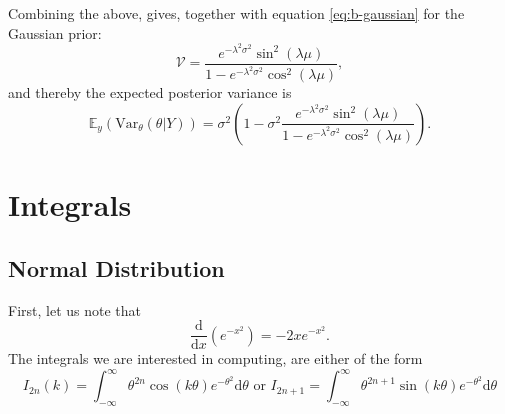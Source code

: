 \documentclass[]{report}
\begin{document}
Combining the above, gives, together with equation \eqref{eq:b-gaussian} for the Gaussian prior:
\begin{equation}
    \mathcal{V} = \frac{e^{-\lambda^2\sigma^2} \sin^2(\lambda\mu)}{1-e^{-\lambda^2\sigma^2} \cos^2(\lambda\mu)},
\end{equation}
and thereby the expected posterior variance is
\begin{equation}
    \mathbb{E}_y(\text{Var}_{\theta}(\theta | Y)) = \sigma^2(1-\sigma^2\frac{e^{-\lambda^2\sigma^2} \sin^2(\lambda\mu)}{1-e^{-\lambda^2\sigma^2} \cos^2(\lambda\mu)}).
\end{equation}

\appendix

\chapter{Integrals}
\section{Normal Distribution}
First, let us note that
\[
\frac{\text{d}}{\text{d}x}(e^{- x^2}) = - 2 x e^{ - x ^2}
.\]
The integrals we are interested in computing, are either of the form
\[
	I_{2n}(k) = \int_{- \infty}^{\infty} \theta^{2n} \cos (k \theta) e^{ - \theta^2}\text{d}\theta \text{ or } I_{2n + 1} = \int_{- \infty}^{\infty} \theta^{2n + 1} \sin (k \theta) e^{ - \theta^2}\text{d} \theta
\]



\end{document}
